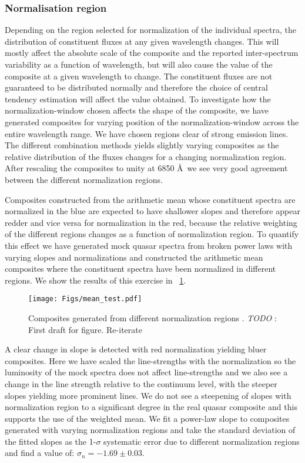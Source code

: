 \documentclass{aa}    %
\newcommand{\figref}[1]{\ref{fig:#1}}
\newcommand{\Fig}[1]{\figurename~\figref{#1}}
\newcommand{\fig}[1]{\Fig{#1}}
\newcommand{\figlabel}[1]{\label{fig:#1}}
\newcommand{\sectlabel}[1]{\label{sect:#1}}
\newcommand{\todo}[3]{{\color{#2}\emph{#1}: #3}}
\newcommand{\jstodo}[1]{\todo{TODO }{green}{#1}}
\begin{document}
{\subsubsection{Normalisation region}  \sectlabel{Normalisation region}
Depending on the region selected for normalization of the individual spectra, the distribution of constituent fluxes at any given wavelength changes. This will mostly affect the absolute scale of the composite and the reported inter-spectrum variability as a function of wavelength, but will also cause the value of the composite at a given wavelength to change. The constituent fluxes are not guaranteed to be distributed normally and therefore the choice of central tendency estimation will affect the value obtained. To investigate how the normalization-window chosen affects the shape of the composite, we have generated composites for varying position of the normalization-window across the entire wavelength range. We have chosen regions clear of strong emission lines. The different combination methods yields slightly varying composites as the relative distribution of the fluxes changes for a changing normalization region. After rescaling the composites to unity at 6850 \AA~we see very good agreement between the different normalization regions. 

Composites constructed from the arithmetic mean whose constituent spectra are normalized in the blue are expected to have shallower slopes and therefore appear redder and vice versa for normalization in the red, because the relative weighting of the different regions changes as a function of normalization region. To quantify this effect we have generated mock quasar spectra from broken power laws with varying slopes and normalizations and constructed the arithmetic mean composites where the constituent spectra have been normalized in different regions. 
We show the results of this exercise in \fig{mean_test}.
 \begin{figure}[hbtp]
   \centering
   \texttt{[image: Figs/mean\_test.pdf]}
   \caption[]{Composites generated from different normalization regions . \jstodo{First draft for figure. Re-iterate}}
  \figlabel{mean_test}
 \end{figure}
 A clear change in slope is detected with red normalization yielding bluer composites. Here we have scaled the line-strengths with the normalization so the luminosity of the mock spectra does not affect line-strengths and we also see a change in the line strength relative to the continuum level, with the steeper slopes yielding more prominent lines. We do not see a steepening of slopes with normalization region to a significant degree in the real quasar composite and this supports the use of the weighted mean. We fit a power-law slope to composites generated with varying normalization regions and take the standard deviation of the fitted slopes as the 1-$\sigma$ systematic error due to different normalization regions and find a value of: $\sigma_{n} = -1.69 \pm 0.03$.



}
\end{document}
